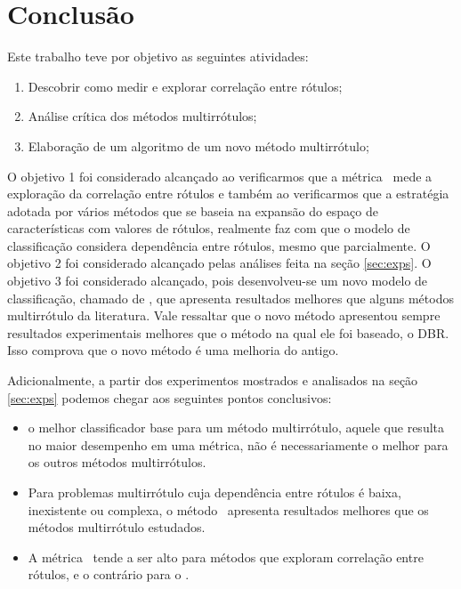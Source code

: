 



\FloatBarrier



\chapter{Conclusão}
\label{sec:conclusions}

Este trabalho teve por objetivo as seguintes atividades:
\begin{enumerate}
 \item Descobrir como medir e explorar correlação entre rótulos;
 \item Análise crítica dos métodos multirrótulos;
 \item Elaboração de um algoritmo de um novo método multirrótulo;
\end{enumerate}
O objetivo 1 foi considerado alcançado ao verificarmos que a métrica \SA~mede a 
exploração da correlação entre rótulos e também ao verificarmos que a estratégia adotada por vários 
métodos que se baseia na expansão do espaço de características com valores de rótulos, realmente
faz com que o modelo de classificação considera dependência entre rótulos, mesmo que parcialmente.
O objetivo 2 foi considerado alcançado pelas análises feita na seção \ref{sec:exps}.
O objetivo 3 foi considerado alcançado, pois desenvolveu-se um novo modelo de classificação,
chamado de \MRLM, que apresenta resultados melhores que alguns métodos multirrótulo da literatura.
Vale ressaltar que o novo método apresentou sempre resultados experimentais melhores que o método na qual
ele foi baseado, o DBR. Isso comprova que o novo método é uma melhoria do antigo.

Adicionalmente, a partir dos experimentos mostrados e analisados na seção \ref{sec:exps} podemos
chegar aos seguintes pontos conclusivos:
  \begin{itemize}
   \item o melhor classificador base para um método multirrótulo, aquele que resulta no maior desempenho em uma métrica,
   não é necessariamente o melhor para os outros métodos multirrótulos. 
   \item Para problemas multirrótulo cuja dependência entre rótulos é baixa, inexistente ou complexa, o
   método \BR~apresenta resultados melhores que os métodos multirrótulo estudados.
   \item A métrica \SA~tende a ser alto para métodos que exploram correlação entre rótulos, e o contrário
   para o \HL.
  \end{itemize}


  
